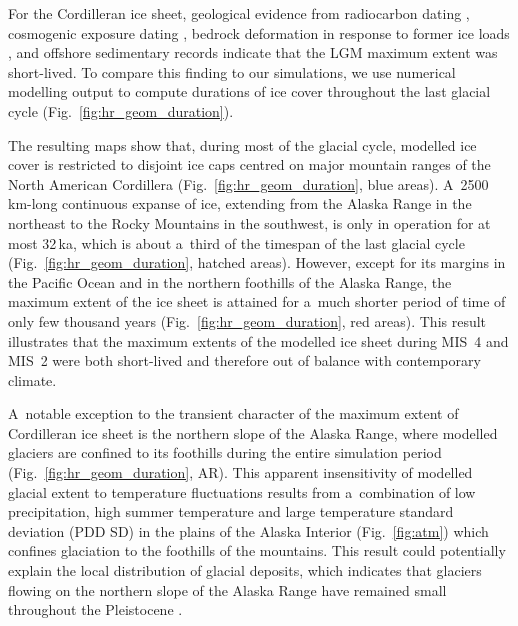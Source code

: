 \documentclass[tc, manuscript]{copernicus}
\begin{document}
      For the Cordilleran ice sheet, geological evidence from radiocarbon
      dating \citep{Clague.etal.1980, Clague.1985, Clague.1986,
      Porter.Swanson.1998, Menounos.etal.2008}, cosmogenic exposure dating
      \citep{Stroeven.etal.2010, Stroeven.etal.2014, Margold.etal.2014},
      bedrock deformation in response to former ice loads
      \citep{Clague.James.2002, Clague.etal.2005}, and offshore sedimentary
      records \citep{Cosma.etal.2008, Davies.etal.2011} indicate that the
      LGM maximum extent was short-lived. To compare this finding to our
      simulations, we use numerical modelling output to compute durations of
      ice cover throughout the last glacial cycle
      (Fig.~\ref{fig:hr_geom_duration}).

      The resulting maps show that, during most of the glacial cycle,
      modelled ice cover is restricted to disjoint ice caps centred on major
      mountain ranges of the North American Cordillera
      (Fig.~\ref{fig:hr_geom_duration}, blue areas). A~2500\,\unit{km}-long
      continuous expanse of ice, extending from the Alaska Range in the
      northeast to the Rocky Mountains in the southwest, is only in
      operation for at most 32\,\unit{ka}, which is about a~third of the
      timespan of the last glacial cycle (Fig.~\ref{fig:hr_geom_duration},
      hatched areas). However, except for its margins in the Pacific Ocean
      and in the northern foothills of the Alaska Range, the maximum extent
      of the ice sheet is attained for a~much shorter period of time of only
      few thousand years (Fig.~\ref{fig:hr_geom_duration}, red areas). This
      result illustrates that the maximum extents of the modelled ice sheet
      during MIS~4 and MIS~2 were both short-lived and therefore out of
      balance with contemporary climate.

      A~notable exception to the transient character of the maximum extent
      of Cordilleran ice sheet is the northern slope of the Alaska Range,
      where modelled glaciers are confined to its foothills during the
      entire simulation period (Fig.~\ref{fig:hr_geom_duration}, AR). This
      apparent insensitivity of modelled glacial extent to temperature
      fluctuations results from a~combination of low precipitation, high
      summer temperature and large temperature standard deviation (PDD SD)
      in the plains of the Alaska Interior (Fig.~\ref{fig:atm}) which
      confines glaciation to the foothills of the mountains. This result
      could potentially explain the local distribution of glacial deposits,
      which indicates that glaciers flowing on the northern slope of the
      Alaska Range have remained small throughout the Pleistocene
      \citep{Kaufman.Manley.2004}.
\end{document}
